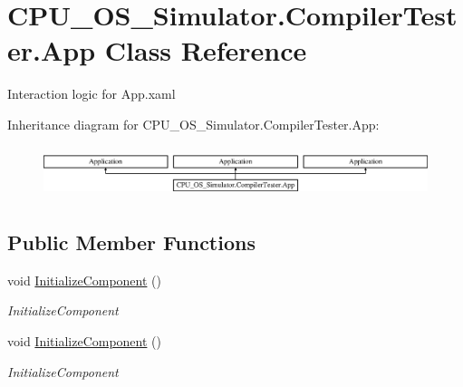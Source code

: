 \hypertarget{class_c_p_u___o_s___simulator_1_1_compiler_tester_1_1_app}{}\section{C\+P\+U\+\_\+\+O\+S\+\_\+\+Simulator.\+Compiler\+Tester.\+App Class Reference}
\label{class_c_p_u___o_s___simulator_1_1_compiler_tester_1_1_app}


Interaction logic for App.\+xaml  


Inheritance diagram for C\+P\+U\+\_\+\+O\+S\+\_\+\+Simulator.\+Compiler\+Tester.\+App\+:\begin{figure}[H]
\begin{center}
\leavevmode
\includegraphics[height=1.523810cm]{class_c_p_u___o_s___simulator_1_1_compiler_tester_1_1_app}
\end{center}
\end{figure}
\subsection*{Public Member Functions}
\begin{DoxyCompactItemize}
\item 
void \hyperlink{class_c_p_u___o_s___simulator_1_1_compiler_tester_1_1_app_a7d535b75c41bf3e0736a88743bec2296}{Initialize\+Component} ()
\begin{DoxyCompactList}\small\item\em Initialize\+Component \end{DoxyCompactList}\item 
void \hyperlink{class_c_p_u___o_s___simulator_1_1_compiler_tester_1_1_app_a7d535b75c41bf3e0736a88743bec2296}{Initialize\+Component} ()
\begin{DoxyCompactList}\small\item\em Initialize\+Component \end{DoxyCompactList}\end{DoxyCompactItemize}
